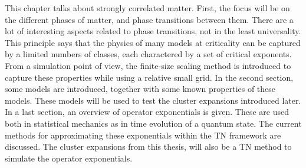 This chapter talks about strongly correlated matter. First, the focus will be on the different phases of matter, and phase transitions between them. There are a lot of interesting aspects related to phase transitions, not in the least universality. This principle says that the physics of many models at criticality can be captured by a limited numbers of classes, each charactered by a set of critical exponents. From a simulation point of view, the finite-size scaling method is introduced to capture these properties while using a relative small grid.
In the second section, some models are introduced, together with some known properties of these models. These models will be used to test the cluster expansions introduced later.
In a last section, an overview of operator exponentials is given. These are used both in statistical mechanics as in time evolution of a quantum state. The current methods for approximating these exponentials within the \Gls{TN} framework are discussed. The cluster expansions from this thesis, will also be a \Gls{TN} method to simulate the operator exponentials.